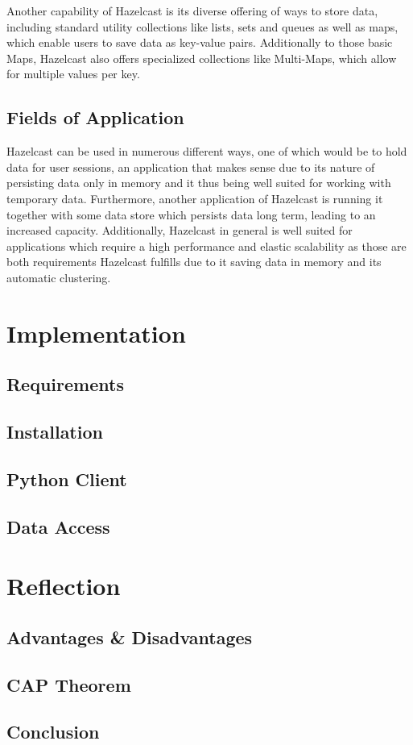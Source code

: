 Another capability of Hazelcast is its diverse offering of ways to store data, including standard utility collections like lists, sets and queues as well as maps, which enable users to save data as key-value pairs. Additionally to those basic Maps, Hazelcast also offers  
specialized collections like Multi-Maps, which allow for multiple values per key. \cite{Johns.2015}
\subsection{Fields of Application} \label{subsec:fieldsOfApplicationHazelcast}

Hazelcast can be used in numerous different ways, one of which would be to hold data for user sessions, an application that makes sense due to its nature 
of persisting data only in memory and it thus being well suited for working with temporary data. Furthermore, another application of Hazelcast is 
running it together with some data store which persists data long term, leading to an increased capacity. Additionally, Hazelcast in general is well 
suited for applications which require a high performance and elastic scalability as those are both requirements Hazelcast fulfills due to it saving data in memory and 
its automatic clustering. \cite{Johns.2015} \newline


\section{Implementation} \label{sec:implementationHazelcast}
\subsection{Requirements} \label{subsec:requirementsHazelcast}
\subsection{Installation} \label{subsec:installationHazelcast}
\subsection{Python Client} \label{subsec:pythonClientHazelcast}
\subsection{Data Access} \label{subsec:dataAccessHazelcast}

\section{Reflection} \label{sec:reflectionHazelcast}
\subsection{Advantages \& Disadvantages} \label{subsec:advantagesDisadvantagesHazelcast}
\subsection{CAP Theorem} \label{subsec:capTheoremHazelcast}
\subsection{Conclusion} \label{subsec:conclusionHazelcast}

